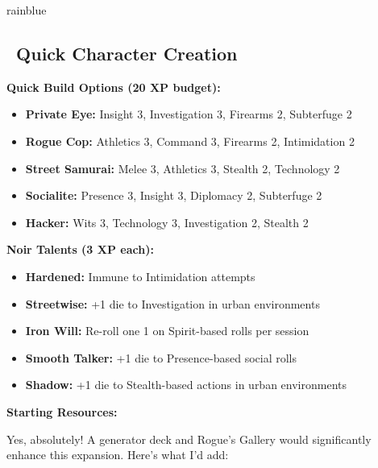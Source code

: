 \documentclass[11pt]{article}
\begin{document}
\begin{noirsection}{rainblue}
\subsection*{\faUser\ Quick Character Creation}

\textbf{Quick Build Options (20 XP budget):}
\begin{itemize}
    \item \textbf{Private Eye:} Insight 3, Investigation 3, Firearms 2, Subterfuge 2
    \item \textbf{Rogue Cop:} Athletics 3, Command 3, Firearms 2, Intimidation 2
    \item \textbf{Street Samurai:} Melee 3, Athletics 3, Stealth 2, Technology 2
    \item \textbf{Socialite:} Presence 3, Insight 3, Diplomacy 2, Subterfuge 2
    \item \textbf{Hacker:} Wits 3, Technology 3, Investigation 2, Stealth 2
\end{itemize}

\textbf{Noir Talents (3 XP each):}
\begin{itemize}
    \item \textbf{Hardened:} Immune to Intimidation attempts
    \item \textbf{Streetwise:} +1 die to Investigation in urban environments
    \item \textbf{Iron Will:} Re-roll one 1 on Spirit-based rolls per session
    \item \textbf{Smooth Talker:} +1 die to Presence-based social rolls
    \item \textbf{Shadow:} +1 die to Stealth-based actions in urban environments
\end{itemize}

\textbf{Starting Resources:}
\end{noirsection}

Yes, absolutely! A generator deck and Rogue's Gallery would significantly enhance this expansion. Here's what I'd add:
\end{document}
